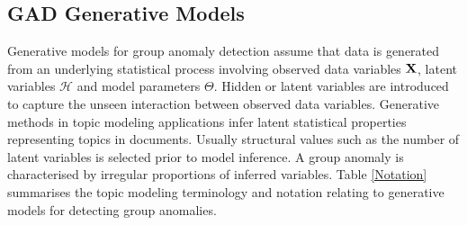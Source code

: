 \subsection{GAD Generative Models} \label{Sec:G}
Generative models for group anomaly detection   assume that data is generated from an underlying statistical process involving observed data variables $\bf X$,  latent variables $\mathcal{H}$ and model parameters $\Theta$.   Hidden or latent variables are introduced to capture the unseen interaction between observed  data variables. Generative methods in topic modeling applications infer  latent statistical properties representing topics in documents.  Usually structural values such as the number of latent variables is selected prior to model inference. %
A group anomaly is characterised by irregular proportions of inferred  variables. %
Table \ref{Notation} summarises the topic modeling  terminology and notation relating to generative models for detecting group anomalies. 


 


 

 


 




